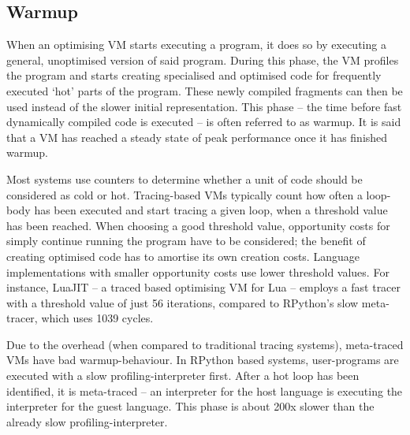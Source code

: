 











\subsection{Warmup}

When an optimising VM starts executing a program, it does so by executing a
general, unoptimised version of said program. During this phase, the VM profiles
the program and starts creating specialised and optimised code for frequently
executed `hot' parts of the program. These newly compiled fragments can then be
used instead of the slower initial representation. This phase -- the time before
fast dynamically compiled code is executed -- is often referred to as warmup.
It is said that a VM has reached a steady state of peak performance once it has
finished warmup.

Most systems use counters to determine whether a unit of code should be
considered as cold or hot. Tracing-based VMs typically count how often a loop-body has
been executed and start tracing a given loop, when a threshold value has been
reached. When choosing a good threshold value, opportunity costs for simply
continue running the program have to be considered; the benefit
of creating optimised code has to amortise its own creation costs. Language
implementations with smaller opportunity costs use lower threshold values. For
instance, LuaJIT -- a traced based optimising VM for Lua -- employs a fast
tracer with a threshold value of just 56 iterations, compared to RPython's slow
meta-tracer, which uses 1039 cycles.

Due to the overhead (when compared to traditional tracing systems), meta-traced
VMs have bad warmup-behaviour. In RPython based systems, user-programs are
executed with a slow profiling-interpreter first. After a hot loop has been
identified, it is meta-traced -- an interpreter for the host language is
executing the interpreter for the guest language. This phase is about 200x
slower than the already slow profiling-interpreter.


